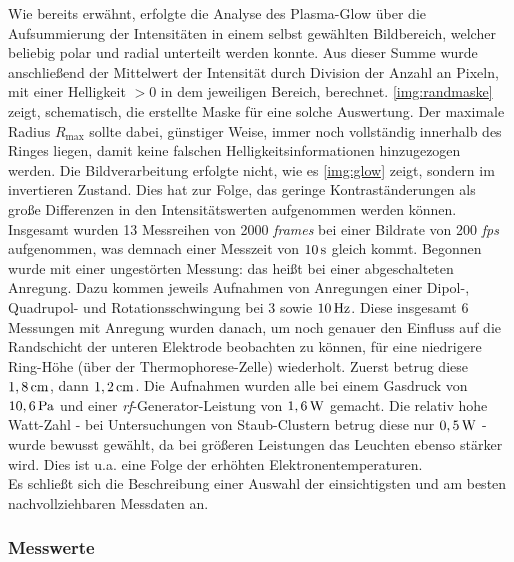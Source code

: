 \documentclass[numbers=noenddot,a4paper]{scrartcl}
\newcommand{\ix}[1]{_\text{#1}}
\newcommand{\tilt}[1]{\textit{#1}}
\begin{document}
		Wie bereits erwähnt, erfolgte die Analyse des Plasma-Glow über die Aufsummierung der Intensitäten in einem selbst gewählten Bildbereich, welcher beliebig polar und radial unterteilt werden konnte. Aus dieser Summe wurde anschließend der Mittelwert der Intensität durch Division der Anzahl an Pixeln, mit einer Helligkeit $>0$ in dem jeweiligen Bereich, berechnet. \ref{img:randmaske} zeigt, schematisch, die erstellte Maske für eine solche Auswertung. Der maximale Radius $R\ix{max}$ sollte dabei, günstiger Weise, immer noch vollständig innerhalb des Ringes liegen, damit keine falschen Helligkeitsinformationen hinzugezogen werden. Die Bildverarbeitung erfolgte nicht, wie es \ref{img:glow} zeigt, sondern im invertieren Zustand. Dies hat zur Folge, das geringe Kontraständerungen als große Differenzen in den Intensitätswerten aufgenommen werden können. \\
		Insgesamt wurden 13 Messreihen von 2000 \tilt{frames} bei einer Bildrate von 200 \tilt{fps} aufgenommen, was demnach einer Messzeit von $\unit[10]{s}$ gleich kommt. Begonnen wurde mit einer ungestörten Messung: das heißt bei einer abgeschalteten Anregung. Dazu kommen jeweils Aufnahmen von Anregungen einer Dipol-, Quadrupol- und Rotationsschwingung bei 3 sowie  $\unit[10]{Hz}$. Diese insgesamt 6 Messungen mit Anregung wurden danach, um noch genauer den Einfluss auf die Randschicht der unteren Elektrode beobachten zu können, für eine niedrigere Ring-Höhe (über der Thermophorese-Zelle) wiederholt. Zuerst betrug diese $\unit[1,8]{cm}$, dann $\unit[1,2]{cm}$. Die Aufnahmen wurden alle bei einem Gasdruck von $\unit[10,6]{Pa}$ und einer \tilt{rf}-Generator-Leistung von $\unit[1,6]{W}$ gemacht. Die relativ hohe Watt-Zahl - bei Untersuchungen von Staub-Clustern betrug diese nur $\unit[0,5]{W}$ - wurde bewusst gewählt, da bei größeren Leistungen das Leuchten ebenso stärker wird. Dies ist u.a. eine Folge der erhöhten Elektronentemperaturen. \\
		Es schließt sich die Beschreibung einer Auswahl der einsichtigsten und am besten nachvollziehbaren Messdaten an. 

			\subsubsection*{Messwerte}
\end{document}
